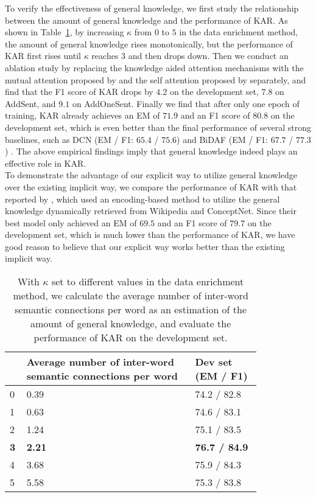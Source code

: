 \documentclass[11pt,a4paper]{article}
\begin{document}
To verify the effectiveness of general knowledge, we first study the relationship between the amount of general knowledge and the performance of KAR. As shown in Table~\ref{t3}, by increasing $\kappa$ from $0$ to $5$ in the data enrichment method, the amount of general knowledge rises monotonically, but the performance of KAR first rises until $\kappa$ reaches $3$ and then drops down. Then we conduct an ablation study by replacing the knowledge aided attention mechanisms with the mutual attention proposed by \citet{seominjoon:2016} and the self attention proposed by \citet{wangwenhui:2017} separately, and find that the F1 score of KAR drops by $4.2$ on the development set, $7.8$ on AddSent, and $9.1$ on AddOneSent. Finally we find that after only one epoch of training, KAR already achieves an EM of $71.9$ and an F1 score of $80.8$ on the development set, which is even better than the final performance of several strong baselines, such as DCN (EM / F1: $65.4$ / $75.6$) \cite{xiongcaiming:2016} and BiDAF (EM / F1: $67.7$ / $77.3$) \cite{seominjoon:2016}. The above empirical findings imply that general knowledge indeed plays an effective role in KAR. \\
To demonstrate the advantage of our explicit way to utilize general knowledge over the existing implicit way, we compare the performance of KAR with that reported by \citet{weissenborndirk:2017}, which used an encoding-based method to utilize the general knowledge dynamically retrieved from Wikipedia and ConceptNet. Since their best model only achieved an EM of $69.5$ and an F1 score of $79.7$ on the development set, which is much lower than the performance of KAR, we have good reason to believe that our explicit way works better than the existing implicit way.
\begin{table}
\centering
\begin{tabular}
{|m{0.03\linewidth}|m{0.57\linewidth}|m{0.22\linewidth}|}
\hline
\boldmath{$\kappa$} &
\textbf{Average number of inter-word semantic connections per word} &
\textbf{Dev set \newline (EM / F1)} \\
\hline
0 & 0.39 & 74.2 / 82.8 \\
\hline
1 & 0.63 & 74.6 / 83.1 \\
\hline
2 & 1.24 & 75.1 / 83.5 \\
\hline
\textbf{3} & \textbf{2.21} & \textbf{76.7 / 84.9} \\
\hline
4 & 3.68 & 75.9 / 84.3 \\
\hline
5 & 5.58 & 75.3 / 83.8 \\
\hline
\end{tabular}
\caption{\label{t3} With $\kappa$ set to different values in the data enrichment method, we calculate the average number of inter-word semantic connections per word as an estimation of the amount of general knowledge, and evaluate the performance of KAR on the development set.}
\end{table}
\end{document}
